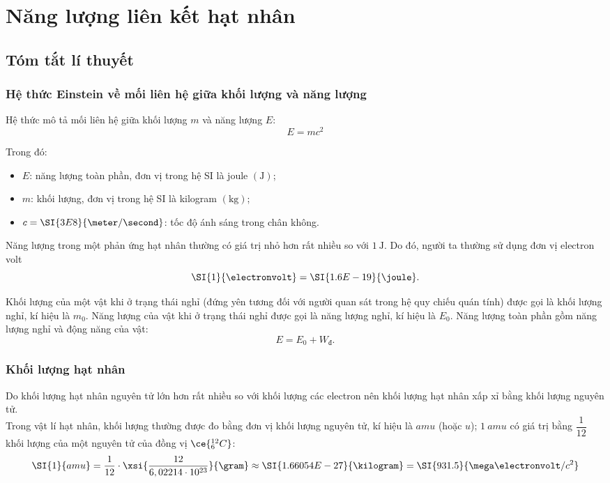 \section{Năng lượng liên kết hạt nhân}
\subsection{Tóm tắt lí thuyết}
\begin{tomtat}
	\subsubsection{Hệ thức Einstein về mối liên hệ giữa khối lượng và năng lượng}
	\begin{boxdl}
		Hệ thức mô tả mối liên hệ giữa khối lượng $m$ và năng lượng $E$:
		\begin{equation}
			E=mc^2
		\end{equation}
	\end{boxdl}
	Trong đó:
	\begin{itemize}
		\item $E$: năng lượng toàn phần, đơn vị trong hệ SI là joule $\left(\si{\joule}\right)$;
		\item $m$: khối lượng, đơn vị trong hệ SI là kilogram $\left(\si{\kilogram}\right)$;
		\item $c=\SI{3E8}{\meter/\second}$: tốc độ ánh sáng trong chân không.
	\end{itemize}
\begin{noidung}{}
	Năng lượng trong một phản ứng hạt nhân thường có giá trị nhỏ hơn rất nhiều so với $\SI{1}{\joule}$. Do đó, người ta thường sử dụng đơn vị electron volt
	$$\SI{1}{\electronvolt}=\SI{1.6E-19}{\joule}.$$
\end{noidung}
\begin{note}
	Khối lượng của một vật khi ở trạng thái nghỉ (đứng yên tương đối với người quan sát trong hệ quy chiếu quán tính) được gọi là khối lượng nghỉ, kí hiệu là $m_0$. Năng lượng của vật khi ở trạng thái nghỉ được gọi là năng lượng nghỉ, kí hiệu là $E_0$. Năng lượng toàn phần gồm năng lượng nghỉ và động năng của vật:
	$$E=E_0+W_\text{đ}.$$
\end{note}
	\subsubsection{Khối lượng hạt nhân}
	Do khối lượng hạt nhân nguyên tử lớn hơn rất nhiều so với khối lượng các electron nên khối lượng hạt nhân xấp xỉ bằng khối lượng nguyên tử.\\
	Trong vật lí hạt nhân, khối lượng thường được đo bằng đơn vị khối lượng nguyên tử, kí hiệu là $\si{amu}$ (hoặc $\si{u}$); $\SI{1}{amu}$ có giá trị bằng $\dfrac{1}{12}$ khối lượng của một nguyên tử của đồng vị $\ce{^{12}_6C}$:
	\begin{equation}
		\SI{1}{amu}=\dfrac{1}{12}\cdot\xsi{\dfrac{12}{6,02214\cdot10^{23}}}{\gram}\approx\SI{1.66054E-27}{\kilogram}=\SI{931.5}{\mega\electronvolt/c^2}
	\end{equation}

\end{tomtat}

